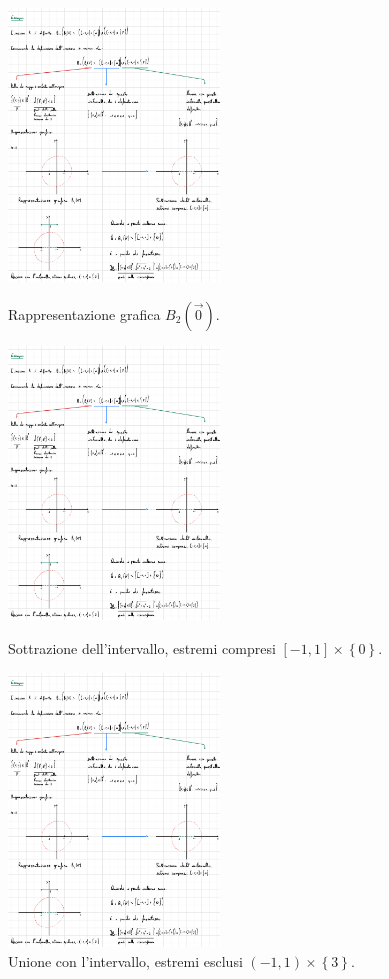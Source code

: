 \documentclass[a4paper]{article}
\begin{document}
	\begin{figure}[!htp]
		\centering
		\includegraphics[width=0.5\textwidth]{img/ex2_insiemi.pdf}
		\caption{Rappresentazione grafica $B_{2}\left(\overrightarrow{0}\right)$.}
		\includegraphics[width=0.5\textwidth]{img/ex2-2_insiemi.pdf}
		\caption{Sottrazione dell'intervallo, estremi compresi $\left[-1,1\right] \times \left\{0\right\}$.}
		\includegraphics[width=0.5\textwidth]{img/ex2-3_insiemi.pdf}
		\caption{Unione con l'intervallo, estremi esclusi $\left(-1,1\right) \times \left\{3\right\}$.}
	\end{figure}
\end{document}
